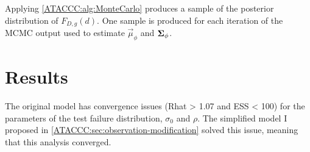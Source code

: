 \documentclass[thesis.tex]{subfiles}
\begin{document}
\begin{algorithm}
  \caption{%
  Algorithm to calculate the Monte Carlo integral in \cref{ATACCC:eq:FDintegral}, producing the posterior distribution of $F_{D,g}(d)$.
  The posterior distribution is represented as a sample $F_{D,g}^{(1)}, \dots, F_{D,g}^{(N)}$.
  $\vec{\mu}_\phi^{(i)}$ and $\matr{\Sigma}_\phi^{(i)}$ denote the $i$th posterior sample of $\vec{\mu}_\phi$ and $\matr{\Sigma}_\phi$ respectively, taken from the MCMC output which produced $N$ posterior samples.
  $M$ is the number of individuals to draw, I found $M =\numprint{100000}$ produced stable estimates of the tail of $F_{D,g}(d)$ if $\dmax = 45$.
 }
 \label{ATACCC:alg:MonteCarlo}
\end{algorithm}

Applying \cref{ATACCC:alg:MonteCarlo} produces a sample of the posterior distribution of $F_{D,g}(d)$.
One sample is produced for each iteration of the MCMC output used to estimate $\vec{\mu}_\phi$ and $\matr{\Sigma}_\phi$.

\section{Results} \label{ATACCC:sec:results}


The original \textcite{hakkiOnset} model has convergence issues (Rhat > 1.07 and ESS < 100) for the parameters of the test failure distribution, $\sigma_0$ and $\rho$.
The simplified model I proposed in \cref{ATACCC:sec:observation-modification} solved this issue, meaning that this analysis converged.
\end{document}
